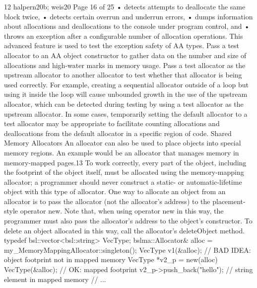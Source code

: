12 halpern20b; weis20
Page 16 of 25
• detects attempts to deallocate the same block twice,
• detects certain overrun and underrun errors,
• dumps information about allocations and deallocations to the console
under program control, and
• throws an exception after a configurable number of allocation operations.
This advanced feature is used to test the exception safety of AA types.
Pass a test allocator to an AA object constructor to gather data on the number
and size of allocations and high-water marks in memory usage. Pass a test
allocator as the upstream allocator to another allocator to test whether that
allocator is being used correctly. For example, creating a sequential allocator
outside of a loop but using it inside the loop will cause unbounded growth in
the use of the upstream allocator, which can be detected during testing by
using a test allocator as the upstream allocator. In some cases, temporarily
setting the default allocator to a test allocator may be appropriate to facilitate
counting allocations and deallocations from the default allocator in a specific
region of code.
Shared Memory Allocators
An allocator can also be used to place objects into special memory regions. An
example would be an allocator that manages memory in memory-mapped
pages.13
To work correctly, every part of the object, including the footprint of the object
itself, must be allocated using the memory-mapping allocator; a programmer
should never construct a static- or automatic-lifetime object with this type of
allocator. One way to allocate an object from an allocator is to pass the
allocator (not the allocator’s address) to the placement-style operator new.
Note that, when using operator new in this way, the programmer must also
pass the allocator’s address to the object’s constructor. To delete an object
allocated in this way, call the allocator’s deleteObject method.
typedef bsl::vector<bsl::string> VecType;
bslma::Allocator& alloc = my_MemoryMappingAllocator::singleton();
VecType v1(&alloc); // BAD IDEA: object footprint not in mapped memory
VecType *v2_p = new(alloc) VecType(&alloc); // OK: mapped footprint
v2_p->push_back("hello"); // string element in mapped memory
// ...

